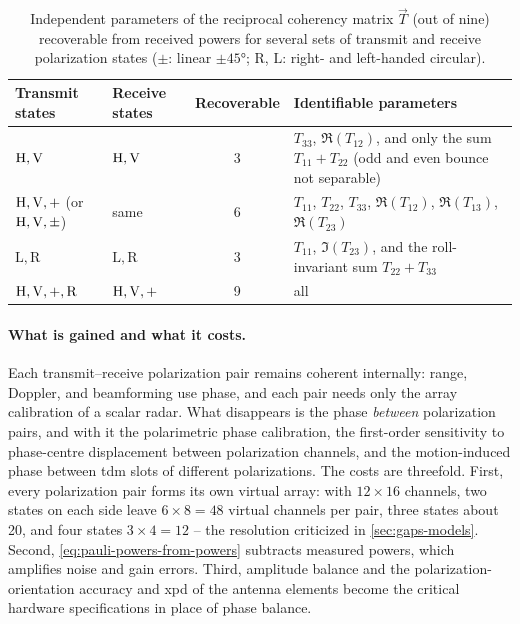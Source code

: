 \begin{table}[!ht]
    \centering
    \caption{Independent parameters of the reciprocal coherency matrix $\vec T$ (out of nine) recoverable from received powers for several sets of transmit and receive polarization states ($\pm$: linear $\pm\ang{45}$; $\mathrm{R}$, $\mathrm{L}$: right- and left-handed circular).}
    \label{tab:recoverable-parameters}
    \small
    \begin{tabularx}{\textwidth}{llcX}
        \toprule
        \textbf{Transmit states} & \textbf{Receive states} & \textbf{Recoverable} & \textbf{Identifiable parameters} \\
        \midrule
        $\mathrm{H}, \mathrm{V}$ & $\mathrm{H}, \mathrm{V}$ & 3 & $T_{33}$, $\Re(T_{12})$, and only the sum $T_{11} + T_{22}$ (odd and even bounce not separable) \\
        $\mathrm{H}, \mathrm{V}, +$ (or $\mathrm{H}, \mathrm{V}, \pm$) & same & 6 & $T_{11}$, $T_{22}$, $T_{33}$, $\Re(T_{12})$, $\Re(T_{13})$, $\Re(T_{23})$ \\
        $\mathrm{L}, \mathrm{R}$ & $\mathrm{L}, \mathrm{R}$ & 3 & $T_{11}$, $\Im(T_{23})$, and the roll-invariant sum $T_{22} + T_{33}$ \\
        $\mathrm{H}, \mathrm{V}, +, \mathrm{R}$ & $\mathrm{H}, \mathrm{V}, +$ & 9 & all \\
        \bottomrule
    \end{tabularx}
\end{table}

\paragraph{What is gained and what it costs.}
Each transmit--receive polarization pair remains coherent internally: range, Doppler, and beamforming use phase, and each pair needs only the array calibration of a scalar radar.
What disappears is the phase \emph{between} polarization pairs, and with it the polarimetric phase calibration, the first-order sensitivity to phase-centre displacement between polarization channels, and the motion-induced phase between \gls{tdm} slots of different polarizations.
The costs are threefold.
First, every polarization pair forms its own virtual array: with $12 \times 16$ channels, two states on each side leave $6 \times 8 = 48$ virtual channels per pair, three states about 20, and four states $3 \times 4 = 12$ -- the resolution criticized in \cref{sec:gaps-models}.
Second, \cref{eq:pauli-powers-from-powers} subtracts measured powers, which amplifies noise and gain errors.
Third, amplitude balance and the polarization-orientation accuracy and \gls{xpd} of the antenna elements become the critical hardware specifications in place of phase balance.

